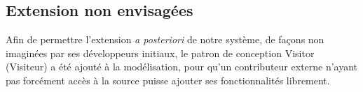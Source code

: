 \documentclass[11pt]{article}
\begin{document}
\subsection{Extension non envisagées}
\label{sec-4-5}
Afin de permettre l'extension \emph{a posteriori} de notre système, de façons non imaginées par ses développeurs initiaux, le patron de conception Visitor (Visiteur) a été ajouté à la modélisation, pour qu'un contributeur externe n'ayant pas forcément accès à la source puisse ajouter ses fonctionnalités librement.
\end{document}
